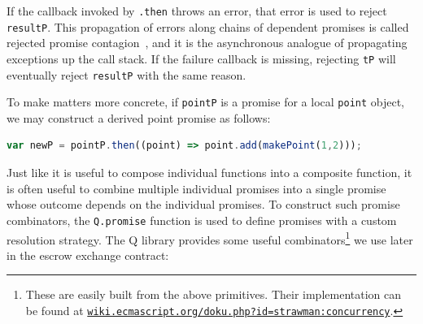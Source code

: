 \documentclass{llncs}
\newcommand{\myurl}[1]{{\href{http://#1}{\texttt{#1}}}}
\begin{document}
If the callback invoked by {\tt .then} throws an error, that error is used to reject {\tt resultP}. This propagation of errors along chains of dependent promises is called rejected promise contagion~\cite{miller:strangers}, and it is the asynchronous analogue of propagating exceptions up the call stack. If the failure callback is missing,  rejecting {\tt tP} will eventually reject {\tt resultP} with the same reason.

To make matters more concrete, if {\tt pointP} is a promise for a local {\tt point} object, we may construct a derived point promise as follows:

\begin{lstlisting}[language=JavaScript,numbers=none]
var newP = pointP.then((point) => point.add(makePoint(1,2)));
\end{lstlisting}

Just like it is useful to compose individual functions into a composite function, it is often useful to combine multiple individual promises into a single promise whose outcome depends on the individual promises. To construct such promise combinators, the {\tt Q.promise} function is used to define promises with a custom resolution strategy. The Q library provides some useful combinators\footnote{These are easily built from the above primitives. Their implementation can be found at \myurl{wiki.ecmascript.org/doku.php?id=strawman:concurrency}.} we use later in the escrow exchange contract:
\end{document}
